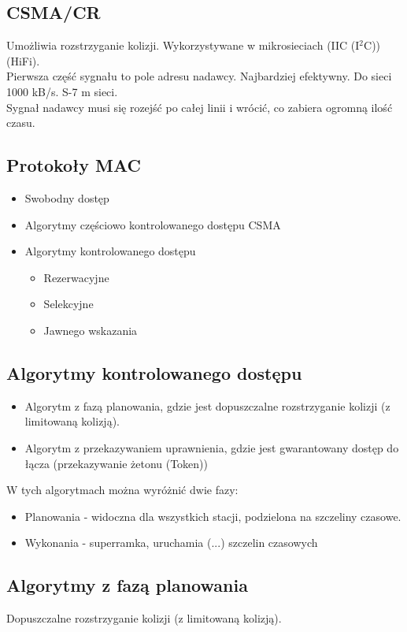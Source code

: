\documentclass[a4paper,twoside]{article}
\begin{document}
	\subsection{CSMA/CR}
		Umożliwia rozstrzyganie kolizji. Wykorzystywane w mikrosieciach (IIC (I$ ^2 $C)) (HiFi).\\
		Pierwsza część sygnału to pole adresu nadawcy. Najbardziej efektywny. Do sieci 1000 kB/s. S-7 m sieci.\\
		Sygnał nadawcy musi się rozejść po całej linii i wrócić, co zabiera ogromną ilość czasu.
	\subsection{Protokoły MAC}
		\begin{itemize}
			\item Swobodny dostęp
			\item Algorytmy częściowo kontrolowanego dostępu CSMA
			\item Algorytmy kontrolowanego dostępu
			\begin{itemize}
				\item Rezerwacyjne
				\item Selekcyjne
				\item Jawnego wskazania
			\end{itemize}
		\end{itemize}
	\subsection{Algorytmy kontrolowanego dostępu}
		\begin{itemize}
			\item Algorytm z fazą planowania, gdzie jest dopuszczalne rozstrzyganie kolizji (z limitowaną kolizją).
			\item Algorytm z przekazywaniem uprawnienia, gdzie jest gwarantowany dostęp do łącza (przekazywanie żetonu (Token))
		\end{itemize}
		W tych algorytmach można wyróżnić dwie fazy:
		\begin{itemize}
			\item Planowania - widoczna dla wszystkich stacji, podzielona na szczeliny czasowe.
			\item Wykonania - superramka, uruchamia (...) szczelin czasowych
		\end{itemize}
	\subsection{Algorytmy z fazą planowania}
		Dopuszczalne rozstrzyganie kolizji (z limitowaną kolizją).
\end{document}

